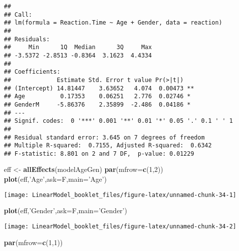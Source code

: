 \documentclass[
]{article}
\newenvironment{Shaded}{\begin{snugshade}}{\end{snugshade}}
\newcommand{\DataTypeTok}[1]{\textcolor[rgb]{0.13,0.29,0.53}{#1}}
\newcommand{\DecValTok}[1]{\textcolor[rgb]{0.00,0.00,0.81}{#1}}
\newcommand{\KeywordTok}[1]{\textcolor[rgb]{0.13,0.29,0.53}{\textbf{#1}}}
\newcommand{\NormalTok}[1]{#1}
\newcommand{\StringTok}[1]{\textcolor[rgb]{0.31,0.60,0.02}{#1}}
\begin{document}
\begin{verbatim}
## 
## Call:
## lm(formula = Reaction.Time ~ Age + Gender, data = reaction)
## 
## Residuals:
##     Min      1Q  Median      3Q     Max 
## -3.5372 -2.8513 -0.8364  3.1623  4.4334 
## 
## Coefficients:
##             Estimate Std. Error t value Pr(>|t|)   
## (Intercept) 14.81447    3.63652   4.074  0.00473 **
## Age          0.17353    0.06251   2.776  0.02746 * 
## GenderM     -5.86376    2.35899  -2.486  0.04186 * 
## ---
## Signif. codes:  0 '***' 0.001 '**' 0.01 '*' 0.05 '.' 0.1 ' ' 1
## 
## Residual standard error: 3.645 on 7 degrees of freedom
## Multiple R-squared:  0.7155, Adjusted R-squared:  0.6342 
## F-statistic: 8.801 on 2 and 7 DF,  p-value: 0.01229
\end{verbatim}

\begin{Shaded}
\begin{Highlighting}[]
\NormalTok{eff <-}\StringTok{ }\KeywordTok{allEffects}\NormalTok{(modelAgeGen) }
\KeywordTok{par}\NormalTok{(}\DataTypeTok{mfrow=}\KeywordTok{c}\NormalTok{(}\DecValTok{1}\NormalTok{,}\DecValTok{2}\NormalTok{))}
\KeywordTok{plot}\NormalTok{(eff,}\StringTok{'Age'}\NormalTok{,}\DataTypeTok{ask=}\NormalTok{F,}\DataTypeTok{main=}\StringTok{'Age'}\NormalTok{) }
\end{Highlighting}
\end{Shaded}

\begin{center}\texttt{[image: LinearModel\_booklet\_files/figure-latex/unnamed-chunk-34-1]} \end{center}

\begin{Shaded}
\begin{Highlighting}[]
\KeywordTok{plot}\NormalTok{(eff,}\StringTok{'Gender'}\NormalTok{,}\DataTypeTok{ask=}\NormalTok{F,}\DataTypeTok{main=}\StringTok{'Gender'}\NormalTok{) }
\end{Highlighting}
\end{Shaded}

\begin{center}\texttt{[image: LinearModel\_booklet\_files/figure-latex/unnamed-chunk-34-2]} \end{center}

\begin{Shaded}
\begin{Highlighting}[]
\KeywordTok{par}\NormalTok{(}\DataTypeTok{mfrow=}\KeywordTok{c}\NormalTok{(}\DecValTok{1}\NormalTok{,}\DecValTok{1}\NormalTok{))}
\end{Highlighting}
\end{Shaded}
\end{document}
